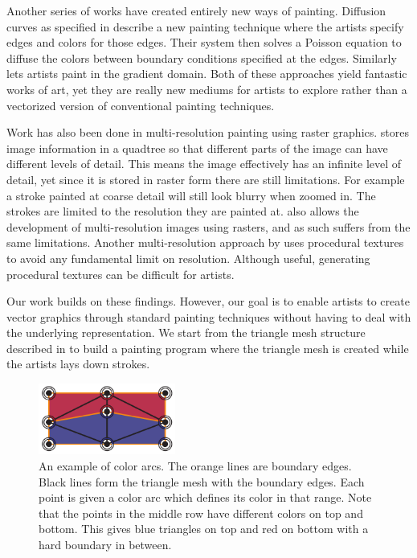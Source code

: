 \documentclass[review]{acmsiggraph}
\begin{document}
Another series of works have created entirely new ways of painting. Diffusion curves as specified in \cite{Orzan:2008:DCV:1360612.1360691}
describe a new painting technique where the artists specify edges and colors for those edges. Their system
then solves a Poisson equation to diffuse the colors between boundary conditions specified at the edges.
Similarly \cite{McCann:2008:RGP:1360612.1360692}
lets artists paint in the gradient domain. Both of these approaches yield fantastic works of art, yet
they are really new mediums for artists to explore rather than a vectorized version of conventional
painting techniques.

Work has also been done in multi-resolution painting using raster graphics. \cite{Berman:1994:MPC:192161.192181}
stores image information in a quadtree so that different parts of the image can have different levels of detail.
This means the image effectively has an infinite level of detail, yet since it is stored in raster form
there are still limitations. For example a stroke painted at coarse detail will still look blurry when
zoomed in. The strokes are limited to the resolution they are painted at. \cite{Carr:2004:PD:1186562.1015809}
also allows the development of multi-resolution images using rasters, and as such suffers from the
same limitations. Another multi-resolution approach by \cite{Perlin:1995:LPP:218380.218437} uses
procedural textures to avoid any fundamental limit on resolution. Although useful,
generating procedural textures can be difficult for artists.

Our work builds on these findings. However, our goal is to enable artists to create vector
graphics through standard painting techniques without having to deal with the underlying representation.
We start from the triangle mesh structure described in \cite{10.1109/TVCG.2012.76} to build a painting program
where the triangle mesh is created while the artists lays down strokes. 

\begin{figure}
    \centering
        \includegraphics[width=0.4\textwidth]{images/colorarcsfinal}
    \caption{An example of color arcs. The orange lines are boundary edges. Black lines form the triangle
    mesh with the boundary edges. Each point is given a color arc which defines its color in that range.
    Note that the points in the middle row have different colors on top and bottom. This gives blue
    triangles on top and red on bottom with a hard boundary in between.}
    \label{fig:arcs}
\end{figure}
\end{document}
